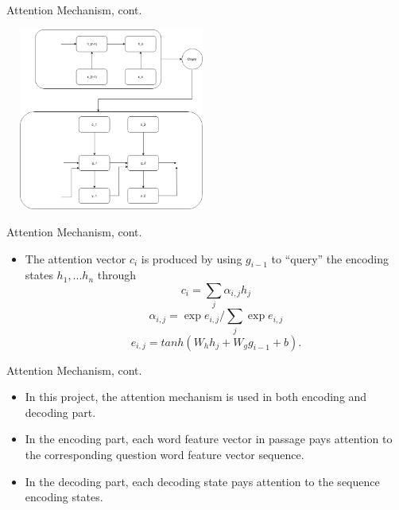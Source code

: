 \documentclass{beamer}
\begin{document}
\begin{frame}{Attention Mechanism, cont.}
    \begin{examples}
     \begin{center}
        \includegraphics[width=7cm, height=6cm]{figures/attention}
    \end{center}
    \end{examples}
\end{frame}

\begin{frame}{Attention Mechanism, cont.}
    \begin{examples}
        \begin{itemize}
            \item The attention vector $c_i$ is produced by using $g_{i-1}$ to ``query'' the encoding states $h_1, ... h_n$ through
        $$c_i = \sum _j {\alpha _{i,j} h_j}$$
        $$\alpha _{i,j} = \exp{e_{i,j}} / \sum _j {\exp{e_{i,j}}}$$
        $$e_{i,j} = tanh(W_h h_j + W_g g_{i-1} + b).$$
        \end{itemize}
    \end{examples}
\end{frame}


\begin{frame}{Attention Mechanism, cont.}
    \begin{itemize}
        \item In this project, the attention mechanism is used in both encoding and decoding part.
        \item In the encoding part, each word feature vector in passage pays attention to the corresponding question word feature vector sequence.
        \item In the decoding part, each decoding state pays attention to the sequence encoding states.
    \end{itemize}






\end{frame}
\end{document}
